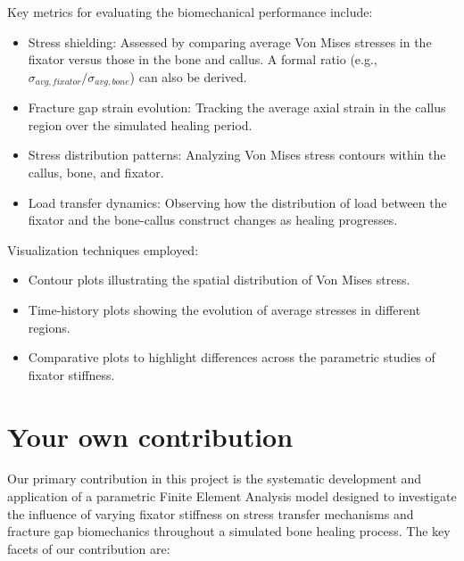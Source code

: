 \documentclass{article}
\begin{document}
Key metrics for evaluating the biomechanical performance include:
\begin{itemize}
  \item Stress shielding: Assessed by comparing average Von Mises stresses in the fixator versus those in the bone and callus. A formal ratio (e.g., $\sigma_{avg,fixator}/\sigma_{avg,bone}$) can also be derived.
  \item Fracture gap strain evolution: Tracking the average axial strain in the callus region over the simulated healing period.
  \item Stress distribution patterns: Analyzing Von Mises stress contours within the callus, bone, and fixator.
  \item Load transfer dynamics: Observing how the distribution of load between the fixator and the bone-callus construct changes as healing progresses.
\end{itemize}

Visualization techniques employed:
\begin{itemize}
  \item Contour plots illustrating the spatial distribution of Von Mises stress.
  \item Time-history plots showing the evolution of average stresses in different regions.
  \item Comparative plots to highlight differences across the parametric studies of fixator stiffness.
\end{itemize}


\section{Your own contribution}

Our primary contribution in this project is the systematic development and application of a parametric Finite Element Analysis model designed to investigate the influence of varying fixator stiffness on stress transfer mechanisms and fracture gap biomechanics throughout a simulated bone healing process. The key facets of our contribution are:
\end{document}
